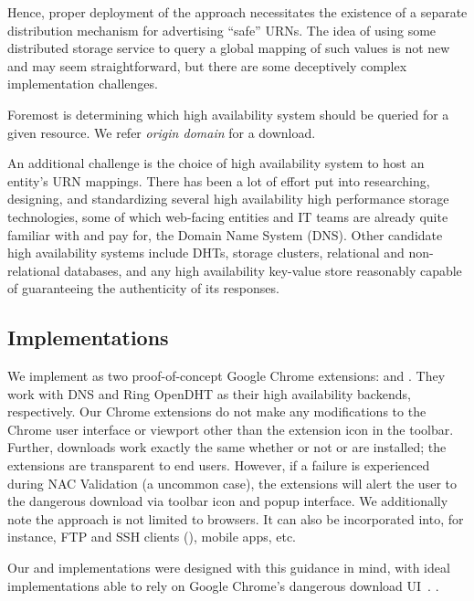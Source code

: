 Hence, proper deployment of the \SYSTEM{} approach necessitates the existence of
a separate distribution mechanism for advertising ``safe'' URNs. The idea of
using some distributed storage service to query a global mapping of such values
is not new and may seem straightforward, but there are some deceptively complex
implementation challenges.

Foremost is determining which high availability system should be queried for a
given resource. We refer \emph{origin domain} for a download. 

An additional challenge is the choice of high availability system to host an
entity's URN mappings. There has been a lot of effort put into researching,
designing, and standardizing several high availability high performance storage
technologies, some of which web-facing entities and IT teams are already quite
familiar with and pay for, \eg the Domain Name System (DNS). Other candidate
high availability systems include DHTs, storage clusters, relational and
non-relational databases, and any high availability key-value store reasonably
capable of guaranteeing the authenticity of its responses.

\subsection{Implementations}

We implement \SYSTEM{} as two proof-of-concept Google Chrome extensions:
\DNSSYS{} and \DHTSYS{}. They work with DNS and Ring OpenDHT as their high
availability backends, respectively. Our Chrome extensions do not make any
modifications to the Chrome user interface or viewport other than the extension
icon in the toolbar. Further, downloads work exactly the same whether or not
\DNSSYS{} or \DHTSYS{} are installed; the extensions are transparent to end
users. However, if a failure is experienced during NAC Validation (\ie a
uncommon case), the extensions will alert the user to the dangerous download via
toolbar icon and popup interface. We additionally note the \SYSTEM{} approach is
not limited to browsers. It can also be incorporated into, for instance, FTP and
SSH clients (), mobile apps, etc.

Our \DNSSYS{} and \DHTSYS{} implementations were designed with this guidance in
mind, with ideal implementations able to rely on Google Chrome's dangerous
download UI~\cite{ChromeClickThrough}. .

